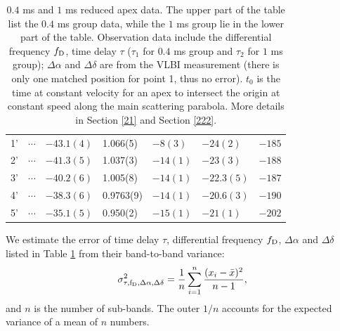 \documentclass[useAMS,usenatbib]{mn2e}
\begin{document}
\begin{table}
\begin{tabular}{c|llllll}
1'&$ \cdots$ & $-43.1(4)$      & 1.066(5)    & $-8(3)$     & $-24(2)$   & $-185$   \\
2'&$\cdots$ & $-41.3(5)$    & 1.037(3)   & $-14(1)$     & $-23(3)$   & $-188$                                   \\
3'&$\cdots$ & $-40.2(6)$  & 1.005(8)    & $-14(1)$       & $-22.3(5)$  & $-187$                                   \\
4'&$\cdots$ & $-38.3(6)$  & 0.9763(9)   & $-14(1)$       & $-20.6(3)$  & $-190$                                    \\
5'&$\cdots$& $-35.1(5)$  & 0.950(2)   & $-15(1)$  & $-21(1)$   &$-202$                                   \\
 \hline                                 
\end{tabular}
\caption{ $0.4$ ms and $1$ ms reduced apex data. 
The upper part of the table list the $0.4$ ms group data, while the $1$ ms group lie in the lower part of the table. 
Observation data include the differential frequency $f_{\rm D}$, time delay
$\tau$ ($\tau_1$ for $0.4$ ms group and $\tau_2$ for $1$ ms group);
$\Delta\alpha$ and $\Delta\delta$ are from the VLBI measurement (there is only one matched position for point 1, thus no error). 
$t_0$ is the time at constant velocity for an apex to intersect the
origin at constant speed along the main scattering parabola.  More
details in Section \ref{21} and Section \ref{222}.
}
\label{table:apex}
\end{table}
We estimate the error of time delay $\tau$, differential frequency
$f_{\rm D}$, $\Delta\alpha$ and $\Delta\delta$  listed in Table
\ref{table:apex} from their band-to-band variance:
\begin{equation}
\sigma^2_{\rm \tau, f_{\rm D},\Delta\alpha, \Delta\delta} = \frac{1}{n}\sum^{n}_{i=1}\frac{(x_i-\bar{x})^2}{n-1},
\end{equation}
and $n$ is the number of sub-bands. The outer $1/n$ accounts for the expected variance of a mean of $n$ numbers.

\end{document}

